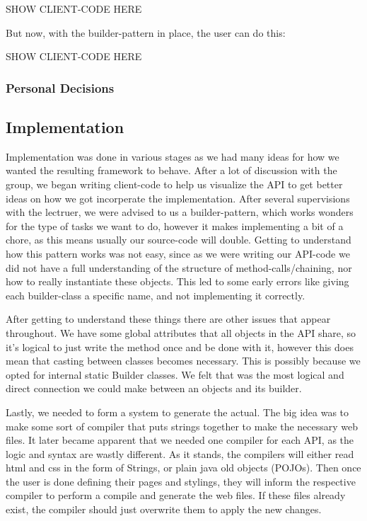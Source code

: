 \documentclass[12pt]{article}
\begin{document}
        SHOW CLIENT-CODE HERE

        But now, with the builder-pattern in place, the user can do this:

        SHOW CLIENT-CODE HERE

        \subsubsection{Personal Decisions}



    \subsection{Implementation}
    Implementation was done in various stages as we had many ideas for how we wanted the resulting framework to behave. After a lot of discussion with the group, we began writing client-code to help us visualize the API to get better ideas on how we got incorperate the implementation. After several supervisions with the lectruer, we were advised to us a builder-pattern, which works wonders for the type of tasks we want to do, however it makes implementing a bit of a chore, as this means usually our source-code will double. Getting to understand how this pattern works was not easy, since as we were writing our API-code we did not have a full understanding of the structure of method-calls/chaining, nor how to really instantiate these objects. This led to some early errors like giving each builder-class a specific name, and not implementing it correctly.

    After getting to understand these things there are other issues that appear throughout. We have some global attributes that all objects in the API share, so it's logical to just write the method once and be done with it, however this does mean that casting between classes becomes necessary. This is possibly because we opted for internal static Builder classes. We felt that was the most logical and direct connection we could make between an objects and its builder.

    Lastly, we needed to form a system to generate the actual. The big idea was to make some sort of compiler that puts strings together to make the necessary web files. It later became apparent that we needed one compiler for each API, as the logic and syntax are wastly different. As it stands, the compilers will either read html and css in the form of Strings, or plain java old objects (POJOs). Then once the user is done defining their pages and stylings, they will inform the respective compiler to perform a compile and generate the web files. If these files already exist, the compiler should just overwrite them to apply the new changes.
\end{document}
